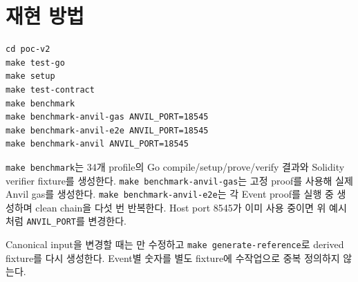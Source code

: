 \documentclass[11pt,a4paper]{extarticle}
\begin{document}
\section{재현 방법}

\begin{verbatim}
cd poc-v2
make test-go
make setup
make test-contract
make benchmark
make benchmark-anvil-gas ANVIL_PORT=18545
make benchmark-anvil-e2e ANVIL_PORT=18545
make benchmark-anvil ANVIL_PORT=18545
\end{verbatim}

\texttt{make benchmark}는 34개 profile의 Go compile/setup/prove/verify 결과와 Solidity
verifier fixture를 생성한다.
\texttt{make benchmark-anvil-gas}는 고정 proof를 사용해 실제 Anvil gas를 생성한다.
\texttt{make benchmark-anvil-e2e}는 각 Event proof를 실행 중 생성하며 clean chain을 다섯 번
반복한다. Host port 8545가 이미 사용 중이면 위 예시처럼 \texttt{ANVIL\_PORT}를 변경한다.

Canonical input을 변경할 때는 만 수정하고
\texttt{make generate-reference}로 derived fixture를 다시 생성한다. Event별 숫자를 별도
fixture에 수작업으로 중복 정의하지 않는다.
\end{document}
